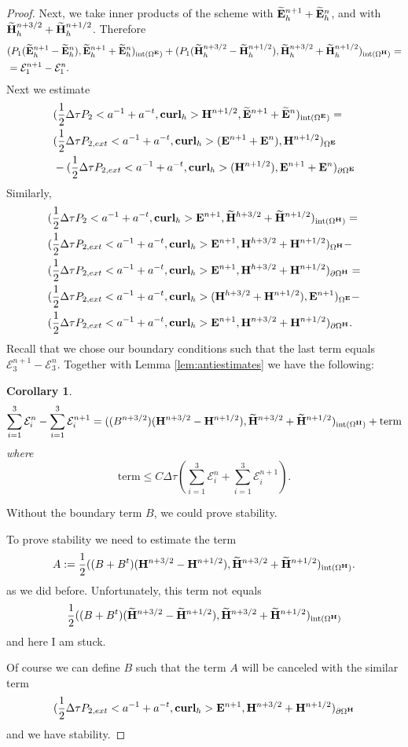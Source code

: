 \documentclass[12pt,reqno]{amsart}
\newcommand{\curl}{{\bf curl}}
\newcommand{\e}{{\bf E}}
\newcommand{\h}{{\bf H}}
\newtheorem{cor}[theorem]{Corollary}
\theoremstyle{definition}
\numberwithin{equation}{section}
\newcommand{\intr}[1]{\mathrm{int}(#1)}
\def\Gw{\Omega}     \def\Gx{\Xi}         \def\Gy{\Psi}
\begin{document}
\begin{proof}
	Next, we take inner products of the scheme with $\widetilde{\e}_h^{n+1}+\widetilde{\e}_h^n$,
	and with 
	$\widetilde{\h}_h^{n+3/2}+\widetilde{\h}_h^{n+1/2}$. Therefore
\begin{align*}
	&
	(P_1(\widetilde{\e}^{n+1}_h-\widetilde{\e}^{n}_h),\widetilde{\e}^{n+1}_h+\widetilde{\e}^{n}_h)_{\intr{\Gw^\e}}+
	(P_1(\widetilde{\h}^{n+3/2}_h-\widetilde{\h}^{n+1/2}_h),\widetilde{\h}^{n+3/2}_h+\widetilde{\h}^{n+1/2}_h)_{\intr{\Gw^\h}}=\\&
=\mathcal{E}_1^{n+1}-\mathcal{E}_1^{n}.
\end{align*}
Next we estimate
\begin{align*}
	&
		(\frac{1}{2}\Delta \tau P_2<a^{-1}+a^{-t},\curl_h>\h^{n+1/2},\widetilde{\e}^{n+1}+\widetilde{\e}^{n})_{ \intr{\Gw^\e}}=\\&
				(\frac{1}{2}\Delta \tau P_{2,ext}<a^{-1}+a^{-t},\curl_h>(\e^{n+1}+\e^{n}),\h^{n+1/2})_{ {\Gw^\e}}\\&
								-(\frac{1}{2}\Delta \tau P_{2,ext}<a^{-1}+a^{-t},\curl_h>(\h^{n+1/2}),\e^{n+1}+\e^{n})_{ {\partial{\Gw^\e}}}
\end{align*}
Similarly,
\begin{align*}
	&
	(\frac{1}{2}\Delta \tau P_2<a^{-1}+a^{-t},\curl_h>\e^{n+1},\widetilde{\h}^{h+3/2}+\widetilde{\h}^{n+1/2})_{\intr{\Gw^\h}}=\\&
		(\frac{1}{2}\Delta \tau P_{2,ext}<a^{-1}+a^{-t},\curl_h>\e^{n+1},\h^{h+3/2}+\h^{n+1/2})_{{\Gw^\h}}-
		\\&
			(\frac{1}{2}\Delta \tau P_{2,ext}<a^{-1}+a^{-t},\curl_h>\e^{n+1},\h^{h+3/2}+\h^{n+1/2})_{\partial{\Gw^\h}}=\\&
			(\frac{1}{2}\Delta \tau P_{2,ext}<a^{-1}+a^{-t},\curl_h>(\h^{h+3/2}+\h^{n+1/2}),\e^{n+1})_{{{\Gw^\e}}}
-\\&
(\frac{1}{2}\Delta \tau P_{2,ext}<a^{-1}+a^{-t},\curl_h>\e^{n+1},\h^{n+3/2}+\h^{n+1/2})_{\partial{\Gw^\h}}.
\end{align*}
Recall that we chose our boundary conditions such that 
the last term equals $\mathcal{E}_3^{n+1}-\mathcal{E}_3^{n}$.
Together with Lemma \ref{lem:antiestimates} we have the following:
\begin{cor}
$$\sum_{i=1}^3\mathcal{E}_i^n-
\sum_{i=1}^3\mathcal{E}_i^{n+1}=
((B^{n+3/2})(\h^{n+3/2}-\h^{n+1/2}),\widetilde{\h}^{n+3/2}+\widetilde{\h}^{n+1/2})_{\intr{\Gw^\h}}+\mathrm{term}
$$
where 
$$
\mathrm{term}\leq C \Delta \tau( \sum_{i=1}^3\mathcal{E}_i^n+
\sum_{i=1}^3\mathcal{E}_i^{n+1}).
$$
\end{cor}
Without the boundary term $B$, we could prove stability.

To prove stability we need to  estimate  the term 
$$
A:=
\frac{1}{2}((B+B^t)(\h^{n+3/2}-\h^{n+1/2}),\widetilde{\h}^{n+3/2}+\widetilde{\h}^{n+1/2})_{\intr{\Gw^\h}}.
$$
as we did before.
Unfortunately, 
this term not equals 
$$
\frac{1}{2}((B+B^t)(\widetilde{\h}^{n+3/2}-\widetilde{\h}^{n+1/2}),\widetilde{\h}^{n+3/2}+\widetilde{\h}^{n+1/2})_{\intr{\Gw^\h}}
$$
and here I am stuck.
	
Of course we can define 
$B$ such that the term $A$ will be canceled with the similar term
$$
(\frac{1}{2}\Delta \tau P_{2,ext}<a^{-1}+a^{-t},\curl_h>\e^{n+1},\h^{n+3/2}+\h^{n+1/2})_{\partial{\Gw^\h}}
$$	
and we have stability.
\end{proof}
\end{document}
